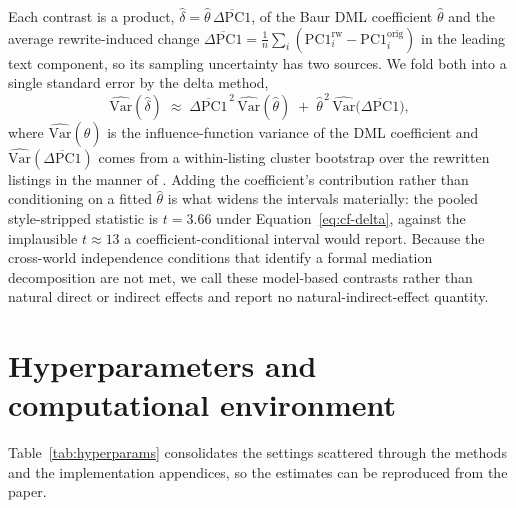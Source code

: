 Each contrast is a product, $\hat\delta = \hat\theta \, \overline{\Delta\mathrm{PC1}}$, of the Baur DML coefficient $\hat\theta$ and the average rewrite-induced change $\overline{\Delta\mathrm{PC1}} = \tfrac{1}{n}\sum_i (\mathrm{PC1}^{\text{rw}}_i - \mathrm{PC1}^{\text{orig}}_i)$ in the leading text component, so its sampling uncertainty has two sources. We fold both into a single standard error by the delta method,
\begin{equation}
\widehat{\mathrm{Var}}(\hat\delta) \;\approx\; \overline{\Delta\mathrm{PC1}}^{\,2}\,\widehat{\mathrm{Var}}(\hat\theta) \;+\; \hat\theta^{\,2}\,\widehat{\mathrm{Var}}\!\big(\overline{\Delta\mathrm{PC1}}\big),
\label{eq:cf-delta}
\end{equation}
where $\widehat{\mathrm{Var}}(\hat\theta)$ is the influence-function variance of the DML coefficient and $\widehat{\mathrm{Var}}(\overline{\Delta\mathrm{PC1}})$ comes from a within-listing cluster bootstrap over the rewritten listings in the manner of \citet{cameron2008bootstrap}. Adding the coefficient's contribution rather than conditioning on a fitted $\hat\theta$ is what widens the intervals materially: the pooled style-stripped statistic is $t = 3.66$ under Equation~\eqref{eq:cf-delta}, against the implausible $t \approx 13$ a coefficient-conditional interval would report. Because the cross-world independence conditions that identify a formal mediation decomposition are not met, we call these model-based contrasts rather than natural direct or indirect effects and report no natural-indirect-effect quantity.

\section{Hyperparameters and computational environment}
\label{app:hyperparams}

Table~\ref{tab:hyperparams} consolidates the settings scattered through the methods and the implementation appendices, so the estimates can be reproduced from the paper.


